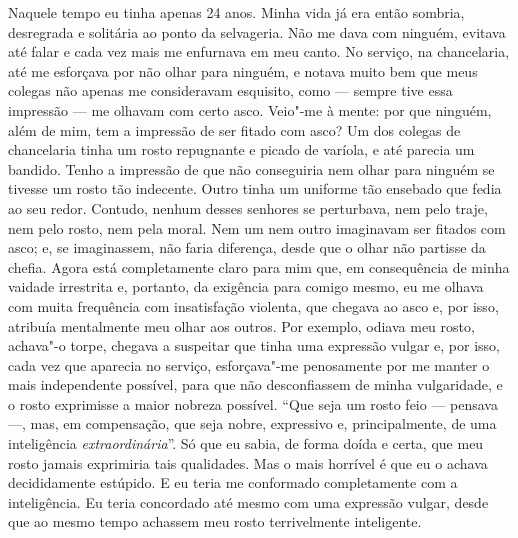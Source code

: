 Naquele tempo eu tinha apenas 24 anos. Minha vida já era então sombria,
desregrada e solitária ao ponto da selvageria. Não me dava com ninguém,
evitava até falar e cada vez mais me enfurnava em meu canto. No serviço,
na chancelaria, até me esforçava por não olhar para ninguém, e notava
muito bem que meus colegas não apenas me consideravam esquisito, como ---
sempre tive essa impressão --- me olhavam com certo asco. Veio"-me à
mente: por que ninguém, além de mim, tem a impressão de ser fitado com
asco? Um dos colegas de chancelaria tinha um rosto repugnante e picado
de varíola, e até parecia um bandido. Tenho a impressão de que não
conseguiria nem olhar para ninguém se tivesse um rosto tão indecente.
Outro tinha um uniforme tão ensebado que fedia ao seu redor. Contudo,
nenhum desses senhores se perturbava, nem pelo traje, nem pelo rosto,
nem pela moral. Nem um nem outro imaginavam ser fitados com asco; e, se
imaginassem, não faria diferença, desde que o olhar não partisse da
chefia. Agora está completamente claro para mim que, em consequência de
minha vaidade irrestrita e, portanto, da exigência para comigo mesmo, eu
me olhava com muita frequência com insatisfação violenta, que chegava ao
asco e, por isso, atribuía mentalmente meu olhar aos outros. Por
exemplo, odiava meu rosto, achava"-o torpe, chegava a suspeitar que tinha
uma expressão vulgar e, por isso, cada vez que aparecia no serviço,
esforçava"-me penosamente por me manter o mais independente possível,
para que não desconfiassem de minha vulgaridade, e o rosto exprimisse a
maior nobreza possível. ``Que seja um rosto feio --- pensava ---, mas, em
compensação, que seja nobre, expressivo e, principalmente, de uma
inteligência \emph{extraordinária}''. Só que eu sabia, de forma doída e
certa, que meu rosto jamais exprimiria tais qualidades. Mas o mais
horrível é que eu o achava decididamente estúpido. E eu teria me
conformado completamente com a inteligência. Eu teria concordado até
mesmo com uma expressão vulgar, desde que ao mesmo tempo achassem meu
rosto terrivelmente inteligente.

